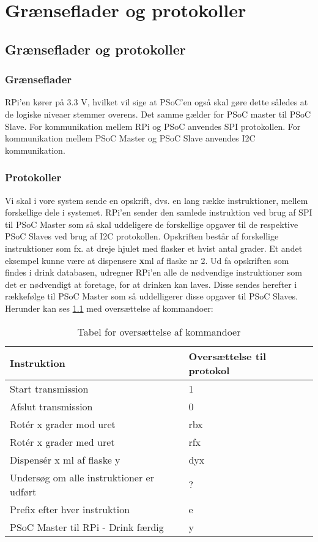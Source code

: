 \chapter{Grænseflader og protokoller}
\section{Grænseflader og protokoller}
\subsection{Grænseflader}
RPi'en kører på 3.3 V, hvilket vil sige at PSoC'en også skal gøre dette således at de logiske niveaer stemmer overens. Det samme gælder for PSoC master til PSoC Slave. For kommunikation mellem RPi og PSoC anvendes SPI protokollen. For kommunikation mellem PSoC Master og PSoC Slave anvendes I2C kommunikation.
\subsection{Protokoller}
Vi skal i vore system sende en opskrift, dvs. en lang række instruktioner, mellem forskellige dele i systemet. RPi'en sender den samlede instruktion ved brug af SPI til PSoC Master som så skal uddeligere de forskellige opgaver til de respektive PSoC Slaves ved brug af I2C protokollen. Opskriften består af forskellige instruktioner som fx. at dreje hjulet med flasker et hvist antal grader. Et andet eksempel kunne være at dispensere \textbf{x}ml af flaske nr 2. Ud fa opskriften som findes i drink databasen, udregner RPi'en alle de nødvendige instruktioner som det er nødvendigt at foretage, for at drinken kan laves. Disse sendes herefter i rækkefølge til PSoC Master som så uddelligerer disse opgaver til PSoC Slaves. Herunder kan ses \ref{tab:protokolTabel} med oversættelse af kommandoer:
\begin{table}[H]
\begin{tabular}{|l|l|}
\hline
Instruktion                              & Oversættelse til protokol \\ \hline
Start transmission                       & 1                         \\ \hline
Afslut transmission                      & 0                         \\ \hline
Rotér x grader mod uret                  & rbx                       \\ \hline
Rotér x grader med uret                  & rfx                       \\ \hline
Dispensér x ml af flaske y               & dyx                       \\ \hline
Undersøg om alle instruktioner er udført & ?                         \\ \hline
Prefix efter hver instruktion            & e                         \\ \hline
PSoC Master til RPi - Drink færdig       & y                         \\ \hline
\end{tabular}
\caption{Tabel for oversættelse af kommandoer}
\label{tab:protokolTabel}
\end{table}

